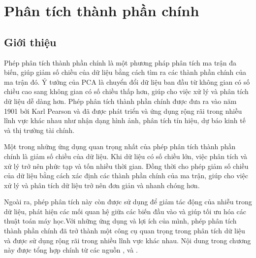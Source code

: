 \documentclass[12pt,a4paper,oneside]{report}
\numberwithin{equation}{section}
\begin{document}
\chapter{ Phân tích thành phần chính }
\section{Giới thiệu}
Phép phân tích thành phần chính là một phương pháp phân tích ma trận đa biến, giúp giảm số chiều của dữ liệu bằng cách tìm ra các thành phần chính của ma trận đó. Ý tưởng của PCA là chuyển đổi dữ liệu ban đầu từ không gian có số chiều cao sang không gian có số chiều thấp hơn, giúp cho việc xử lý và phân tích dữ liệu dễ dàng hơn.
Phép phân tích thành phần chính được đưa ra vào năm 1901 bởi Karl Pearson và đã được phát triển và ứng dụng rộng rãi trong nhiều lĩnh vực khác nhau như nhận dạng hình ảnh, phân tích tín hiệu, dự báo kinh tế và thị trường tài chính.

Một trong những ứng dụng quan trọng nhất của phép phân tích thành phần chính là giảm số chiều của dữ liệu. Khi dữ liệu có số chiều lớn, việc phân tích và xử lý trở nên phức tạp và tốn nhiều thời gian. Đồng thời cho phép giảm số chiều của dữ liệu bằng cách xác định các thành phần chính của ma trận, giúp cho việc xử lý và phân tích dữ liệu trở nên đơn giản và nhanh chóng hơn.

Ngoài ra, phép phân tích này còn được sử dụng để giảm tác động của nhiễu trong dữ liệu, phát hiện các mối quan hệ giữa các biến đầu vào và giúp tối ưu hóa các thuật toán máy học.Với những ứng dụng và lợi ích của mình, phép phân tích thành phần chính đã trở thành một công cụ quan trọng trong phân tích dữ liệu và được sử dụng rộng rãi trong nhiều lĩnh vực khác nhau.
Nội dung trong chương này được tổng hợp chính từ các nguồn \cite{my2020}, \cite{tiep2018} và \cite{hyvarinen2009}.
\end{document}
